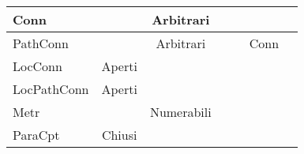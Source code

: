 \documentclass[a4paper,NoNotes,GeneralMath]{stdmdoc}
\newcommand{\Arbitrari}{Arbitrari}
\newcommand{\Numerabili}{Numerabili}
\newcommand{\rd}[1]{{\color{red} #1 }}
\begin{document}
\begin{tabular}{lcccccc}
	Conn            & \crossmark       & \rd\Arbitrari  &                 & \checkmark             &               \\ \hline
	PathConn        & \crossmark       & \rd\Arbitrari  &                 & \checkmark             & Conn          \\ \hline
	LocConn         & \rd{Aperti}      &                &                 &                        &               \\ \hline
	LocPathConn     & \rd{Aperti}      &                &                 &                        &               \\ \hline

	Metr            & \checkmark       & \rd\Numerabili &                 &                        &               \\ \hline
	ParaCpt         & \rd{Chiusi}      & \rd\crossmark  &                 &                        &               \\ \hline
	\end{tabular} \vskip 1.5cm
\end{document}
